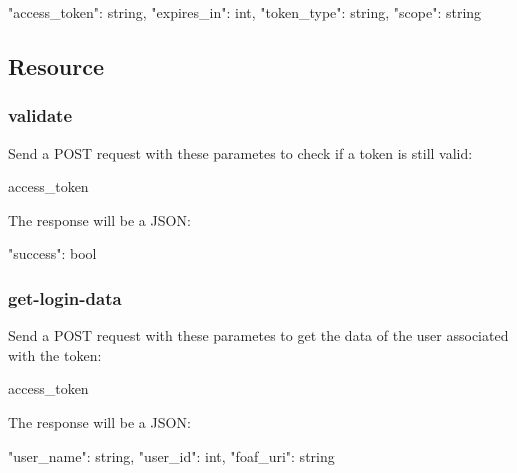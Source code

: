  \begin{DoxyVerb}
   {"access_token": string,
    "expires_in": int,
    "token_type": string,
    "scope": string}
\end{DoxyVerb}
\hypertarget{api_sub2}{}\subsection{\-Resource}\label{api_sub2}
\hypertarget{api_subsub3}{}\subsubsection{validate}\label{api_subsub3}
\-Send a \-P\-O\-S\-T request with these parametes to check if a token is still valid\-:
\begin{DoxyItemize}
\item access\-\_\-token
\end{DoxyItemize}\-The response will be a \-J\-S\-O\-N\-:\par
 \begin{DoxyVerb}
   {"success": bool}
\end{DoxyVerb}
\hypertarget{api_subsub4}{}\subsubsection{get-\/login-\/data}\label{api_subsub4}
\-Send a \-P\-O\-S\-T request with these parametes to get the data of the user associated with the token\-:
\begin{DoxyItemize}
\item access\-\_\-token
\end{DoxyItemize}\-The response will be a \-J\-S\-O\-N\-:\par
 \begin{DoxyVerb}
   {"user_name": string,
    "user_id": int,
    "foaf_uri": string}
\end{DoxyVerb}
 